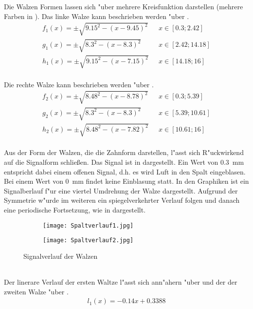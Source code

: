 Die Walzen Formen lassen sich "uber mehrere Kreisfunktion darstellen (mehrere Farben in ). Das linke Walze kann beschrieben werden "uber .
\begin{align}
	{f_1(x)}=\pm\sqrt{9.15^{2}-(x-9.45)^{2}}\,\,\,\,&x\in[0.3; 2.42] \label{eq:Walze1}\\
	{g_1(x)}=\pm\sqrt{8.3^{2}-(x-8.3)^{2}}\,\,\,\,&x\in[2.42; 14.18] \nonumber\\
	{h_1(x)}=\pm\sqrt{9.15^{2}-(x-7.15)^{2}}\,\,\,\,&x\in[14.18; 16] \nonumber
\end{align}\\
Die rechte Walze kann beschrieben werden "uber .
\begin{align}
	{f_2(x)}=\pm\sqrt{8.48^{2}-(x-8.78)^{2}}\,\,\,\,&x\in[0.3; 5.39] \label{eq:Walze2}\\
	{g_2(x)}=\pm\sqrt{8.3^{2}-(x-8.3)^{2}}\,\,\,\,&x\in[5.39; 10.61] \nonumber\\
	{h_2(x)}=\pm\sqrt{8.48^{2}-(x-7.82)^{2}}\,\,\,\,&x\in[10.61; 16] \nonumber
\end{align}\\
Aus der Form der Walzen, die die Zahnform darstellen, l"asst sich R"uckwirkend auf die Signalform schlie\ss{}en. Das Signal ist in  dargestellt. Ein Wert von \SI{0.3}{\milli\meter} entspricht dabei einem offenen Signal, d.h. es wird Luft in den Spalt eingeblasen. Bei einem Wert von \SI{0}{\milli\meter} findet keine Einblasung statt. In den Graphiken ist ein Signalberlauf f"ur eine viertel Umdrehung der Walze dargestellt. Aufgrund der Symmetrie w"urde im weiteren ein spiegelverkehrter Verlauf folgen und danach eine periodische Fortsetzung, wie in  dargestellt.
\begin{figure}[h]
	\centering
	\begin{subfigure}[c]{0.5\textwidth}		
		\texttt{[image: Spaltverlauf1.jpg]}
	\end{subfigure}
	\begin{subfigure}[c]{0.5\textwidth}
		\texttt{[image: Spaltverlauf2.jpg]}
	\end{subfigure}
	\caption{Signalverlauf der Walzen}
	\label{fig:spaltverlauf}
\end{figure}\\
Der linerare Verlauf der ersten Waltze l"asst sich ann"ahern "uber  und der der zweiten Walze "uber .
\begin{align}
{l_1(x)}=-0.14x+0.3388
\label{eq:Spalthoehe1}
\end{align}
